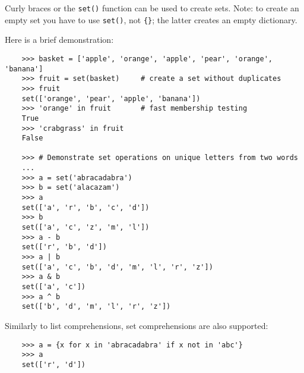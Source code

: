 \documentclass[UTF8]{article}
\begin{document}
Curly braces or the \texttt{set()} function can be used to create sets. Note: to create an empty
set you have to use \texttt{set()}, not \texttt{\{\}}; the latter creates an empty dictionary.

Here is a brief demonstration:
    \begin{verbatim}
    >>> basket = ['apple', 'orange', 'apple', 'pear', 'orange', 'banana']
    >>> fruit = set(basket)     # create a set without duplicates
    >>> fruit
    set(['orange', 'pear', 'apple', 'banana'])
    >>> 'orange' in fruit       # fast membership testing
    True
    >>> 'crabgrass' in fruit
    False

    >>> # Demonstrate set operations on unique letters from two words
    ...
    >>> a = set('abracadabra')
    >>> b = set('alacazam')
    >>> a
    set(['a', 'r', 'b', 'c', 'd'])
    >>> b
    set(['a', 'c', 'z', 'm', 'l'])
    >>> a - b
    set(['r', 'b', 'd'])
    >>> a | b
    set(['a', 'c', 'b', 'd', 'm', 'l', 'r', 'z'])
    >>> a & b
    set(['a', 'c'])
    >>> a ^ b
    set(['b', 'd', 'm', 'l', 'r', 'z'])
\end{verbatim}

Similarly to list comprehensions, set comprehensions are also supported:
\begin{verbatim}
    >>> a = {x for x in 'abracadabra' if x not in 'abc'}
    >>> a
    set(['r', 'd'])
\end{verbatim}
\end{document}
